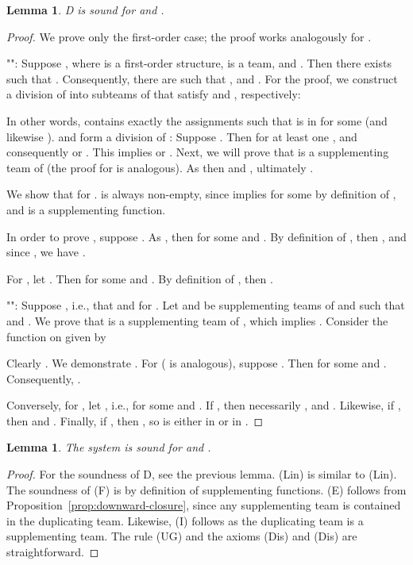 \documentclass[a4paper,english,fleqn,11pt,final]{scrartcl}
\makeatletter
\newcommand{\ie}{i.e.\@\xspace}
\newcommand{\Deriv}[1]{{\normalfont\textsf{#1}}}
\theoremstyle{plain}
\newtheorem{lemma}[theorem]{Lemma}
\theoremstyle{definition}
\makeatother
\begin{document}
\begin{lemma}\label{lem:exists-sound}
\Deriv{D} is sound for  and .
\end{lemma}
\begin{proof}
We prove only the first-order case; the proof works analogously for .

"":
Suppose , where  is a first-order structure,  is a team, and .
Then there exists  such that .
Consequently, there are  such that ,  and .
For the proof, we construct a division of  into subteams  of  that satisfy  and , respectively:

In other words,  contains exactly the assignments  such that  is in  for some  (and likewise ).
 and  form a division of : Suppose .
Then  for at least one , and consequently  or .
This implies  or .
Next, we will prove that  is a supplementing team of  (the proof for  is analogous).
As then  and , ultimately .

\smallskip

We show that  for .
 is always non-empty, since  implies  for some  by definition of , and  is a supplementing function.


In order to prove , suppose .
As , then  for some  and .
By definition of , then , and since , we have .

For , let .
Then  for some  and .
By definition of , then .

\medskip

"":
Suppose , \ie, that  and  for .
Let  and  be supplementing teams of  and  such that  and .
We prove that  is a supplementing team of , which implies .
Consider the function  on  given by

Clearly .
We demonstrate .
For  ( is analogous), suppose .
Then  for some  and .
Consequently, .

Conversely, for , let , \ie,  for some  and .
If , then necessarily , and .
Likewise, if , then  and .
Finally, if , then , so  is either in  or in .
\end{proof}

\begin{lemma}
The system  is sound for  and .
\end{lemma}
\begin{proof}
For the soundness of \Deriv{D}, see the previous lemma.
\Deriv{(Lin)} is similar to \Deriv{(Lin)}.
The soundness of \Deriv{(F)} is by definition of supplementing functions.
\Deriv{(E)} follows from Proposition~\ref{prop:downward-closure}, since any supplementing team is contained in the duplicating team.
Likewise, \Deriv{(I)} follows as the duplicating team is a supplementing team.
The rule \Deriv{(UG)} and the axioms \Deriv{(Dis)} and \Deriv{(Dis)} are straightforward.
\end{proof}
\end{document}
